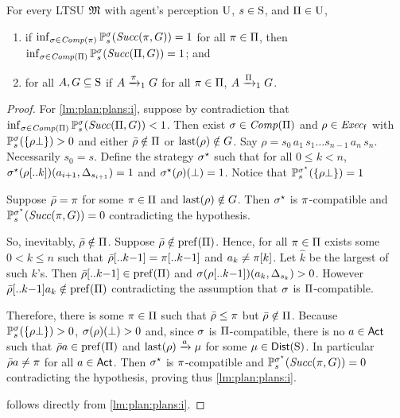 \begin{lemma}\label{lm:plan:plans}
  For every LTSU $\model$ with agent's perception $\Unc$, $s\in\S$,
  and $\plans\in\Unc$,
  \begin{enumerate}
  \item\label{lm:plan:plans:i}%
    if $\inf_{\strat\in\Comp(\plan)}\Prob^\strat_s(\Succ(\plan,G))=1$
    for all $\plan\in\plans$, then
    $\inf_{\strat\in\Comp(\plans)}\Prob^\strat_s(\Succ(\plans,G))=1$; and
  \item\label{lm:plan:plans:ii}%
    for all $A,G\subseteq\S$ if $A\reach{\plan}_1G$ for all
    $\plan\in\plans$, $A\reach{\plans}_1G$.
  \end{enumerate}

\end{lemma}
%
\begin{proof}
  For \cref{lm:plan:plans:i}, suppose by contradiction that
  $\inf_{\strat\in\Comp(\plans)}\Prob^\strat_s(\Succ(\plans,G))<1$.
  Then exist $\strat\in\Comp(\plans)$ and $\rho\in\execf$ with
  $\Prob^\strat_s(\{\rho\complete\})>0$ and either
  $\bar{\rho}\notin\plans$ or $\last(\rho)\notin G$.
  Say $\rho=s_0\, a_1\, s_1\ldots s_{n-1}\, a_n\, s_n$.  Necessarily
  $s_0=s$.
  Define the strategy $\strat^\star$ such that for all $0\leq k<n$,
  $\strat^\star(\rho[..k])(a_{i+1},\Dirac_{s_{i+1}})=1$ and
  $\strat^\star(\rho)(\complete)=1$.  Notice that
  $\Prob^{\strat^\star}_s(\{\rho\complete\})=1$

  Suppose $\bar{\rho}=\plan$ for some $\plan\in\plans$ and
  $\last(\rho)\notin G$.  Then $\strat^\star$ is $\plan$-compatible
  and $\Prob^{\strat^\star}_s(\Succ(\plan,G))=0$ contradicting the
  hypothesis.

  So, inevitably, $\bar{\rho}\notin\plans$.
  Suppose $\bar{\rho}\notin\pref(\plans)$.  Hence, for all
  $\plan\in\plans$ exists some $0<k\leq n$ such that
  $\bar{\rho}[..k{-}1]=\plan[..k{-}1]$ and $a_k\neq\plan[k]$.  Let
  $\hat{k}$ be the largest of such $k$'s.
  Then $\bar{\rho}[..k{-}1]\in\pref(\plans)$ and
  $\strat(\rho[..k{-}1])(a_k,\Dirac_{s_k})>0$.  However
  $\bar{\rho}[..k{-}1]a_k\notin\pref(\plans)$ contradicting the
  assumption that $\strat$ is $\plans$-compatible.

  Therefore, there is some $\plan\in\plans$ such that
  $\bar{\rho}\leq\plan$ but $\bar{\rho}\notin\plans$.
  Because $\Prob^\strat_s(\{\rho\complete\})>0$,
  $\strat(\rho)(\complete)>0$ and, since $\strat$ is
  $\plans$-compatible, there is no $a\in\Act$ such that
  $\bar{\rho}a\in\pref(\plans)$ and $\last(\rho)\reach{a}\mu$ for some
  $\mu\in\Dist(\S)$.
  In particular $\bar{\rho}a\neq\plan$ for all $a\in\Act$.  Then
  $\strat^\star$ is $\plan$-compatible and
  $\Prob^{\strat^\star}_s(\Succ(\plan,G))=0$ contradicting the
  hypothesis, proving thus \cref{lm:plan:plans:i}.

   follows directly from \cref{lm:plan:plans:i}.
\end{proof}



